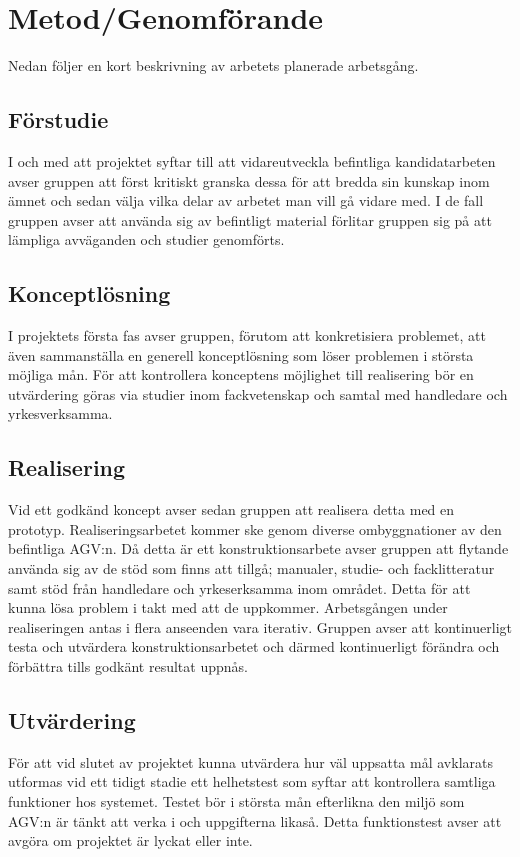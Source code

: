 \documentclass[a4paper,11pt]{article}
\begin{document}
\section{Metod/Genomförande}
Nedan följer en kort beskrivning av arbetets planerade arbetsgång. 

\subsection{Förstudie}
I och med att projektet syftar till att vidareutveckla befintliga
kandidatarbeten avser gruppen att först kritiskt granska dessa för att
bredda sin kunskap inom ämnet och sedan välja vilka delar av arbetet man
vill gå vidare med. I de fall gruppen avser att använda sig av befintligt
material förlitar gruppen sig på att lämpliga avväganden och studier
genomförts.

\subsection{Konceptlösning}
I projektets första fas avser gruppen, förutom att konkretisiera problemet,
att även sammanställa en generell konceptlösning som löser problemen i
största möjliga mån. För att kontrollera konceptens möjlighet till
realisering bör en utvärdering göras via studier inom fackvetenskap och
samtal med handledare och yrkesverksamma.

\subsection{Realisering}
Vid ett godkänd koncept avser sedan gruppen att realisera detta med en
prototyp. Realiseringsarbetet kommer ske genom diverse ombyggnationer av
den befintliga AGV:n. Då detta är ett konstruktionsarbete avser gruppen att
flytande använda sig av de stöd som finns att tillgå; manualer, studie- och
facklitteratur samt stöd från handledare och yrkeserksamma inom området.
Detta för att kunna lösa problem i takt med att de uppkommer. Arbetsgången
under realiseringen antas i flera anseenden vara iterativ. Gruppen avser
att kontinuerligt testa och utvärdera konstruktionsarbetet och därmed
kontinuerligt förändra och förbättra tills godkänt resultat uppnås.

\subsection{Utvärdering}
För att vid slutet av projektet kunna utvärdera hur väl uppsatta mål
avklarats utformas vid ett tidigt stadie ett helhetstest som syftar att
kontrollera samtliga funktioner hos systemet. Testet bör i största mån
efterlikna den miljö som AGV:n är tänkt att verka i och uppgifterna likaså.
Detta funktionstest avser att avgöra om projektet är lyckat eller inte.
\end{document}
